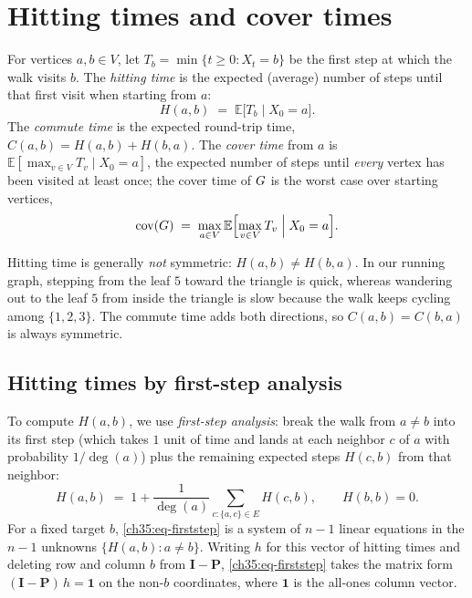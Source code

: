 \section{Hitting times and cover times}

\begin{definition}\label{ch35:def-hitting}
For vertices $a,b \in V$, let $T_b=\min\{t\ge 0: X_t=b\}$ be the first step at which the walk visits $b$. The \emph{hitting time} is the expected (average) number of steps until that first visit when starting from $a$:
\[
  H(a,b)\;=\;\mathbb{E}\bigl[T_b \mid X_0=a\bigr].
\]
The \emph{commute time} is the expected round-trip time, $C(a,b)=H(a,b)+H(b,a)$. The \emph{cover time} from $a$ is $\mathbb{E}[\max_{v\in V}T_v\mid X_0=a]$, the expected number of steps until \emph{every} vertex has been visited at least once; the cover time of $G$ is the worst case over starting vertices,
\[
  \operatorname{cov}(G)\;=\;\max_{a\in V}\mathbb{E}\Bigl[\max_{v\in V}T_v \;\Big|\; X_0=a\Bigr].
\]
\end{definition}

Hitting time is generally \emph{not} symmetric: $H(a,b)\ne H(b,a)$. In our running graph, stepping from the leaf $5$ toward the triangle is quick, whereas wandering out to the leaf $5$ from inside the triangle is slow because the walk keeps cycling among $\{1,2,3\}$. The commute time adds both directions, so $C(a,b)=C(b,a)$ is always symmetric.

\subsection{Hitting times by first-step analysis}

To compute $H(a,b)$, we use \emph{first-step analysis}: break the walk from $a\ne b$ into its first step (which takes $1$ unit of time and lands at each neighbor $c$ of $a$ with probability $1/\deg(a)$) plus the remaining expected steps $H(c,b)$ from that neighbor:
\begin{equation}\label{ch35:eq-firststep}
  H(a,b) \;=\; 1+\frac{1}{\deg(a)}\sum_{c:\{a,c\}\in E} H(c,b),
  \qquad H(b,b)=0.
\end{equation}
For a fixed target $b$, \eqref{ch35:eq-firststep} is a system of $n-1$ linear equations in the $n-1$ unknowns $\{H(a,b):a\ne b\}$. Writing $h$ for this vector of hitting times and deleting row and column $b$ from $\mathbf{I}-\mathbf{P}$, \eqref{ch35:eq-firststep} takes the matrix form $(\mathbf{I}-\mathbf{P})\,h=\mathbf{1}$ on the non-$b$ coordinates, where $\mathbf{1}$ is the all-ones column vector.

